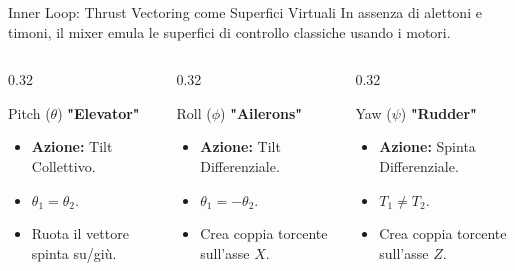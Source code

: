 \documentclass[aspectratio=169]{beamer} %
\begin{document}
\begin{frame}{Inner Loop: Thrust Vectoring come Superfici Virtuali}
    In assenza di alettoni e timoni, il mixer emula le superfici di controllo classiche usando i motori.

    \vspace{0.3cm}
    \begin{columns}[T]
        \begin{column}{0.32\textwidth}
            \begin{alertblock}{Pitch ($\theta$)}
                \centering \textbf{"Elevator"}
                \vspace{0.2cm}
                \begin{itemize}
                    \item \textbf{Azione:} Tilt Collettivo.
                    \item $\theta_1 = \theta_2$.
                    \item Ruota il vettore spinta su/giù.
                \end{itemize}
            \end{alertblock}
        \end{column}

        \begin{column}{0.32\textwidth}
            \begin{block}{Roll ($\phi$)}
                \centering \textbf{"Ailerons"}
                \vspace{0.2cm}
                \begin{itemize}
                    \item \textbf{Azione:} Tilt Differenziale.
                    \item $\theta_1 = -\theta_2$.
                    \item Crea coppia torcente sull'asse $X$.
                \end{itemize}
            \end{block}
        \end{column}

        \begin{column}{0.32\textwidth}
            \begin{exampleblock}{Yaw ($\psi$)}
                \centering \textbf{"Rudder"}
                \vspace{0.2cm}
                \begin{itemize}
                    \item \textbf{Azione:} Spinta Differenziale.
                    \item $T_1 \neq T_2$.
                    \item Crea coppia torcente sull'asse $Z$.
                \end{itemize}
            \end{exampleblock}
        \end{column}
    \end{columns}
\end{frame}
\end{document}
